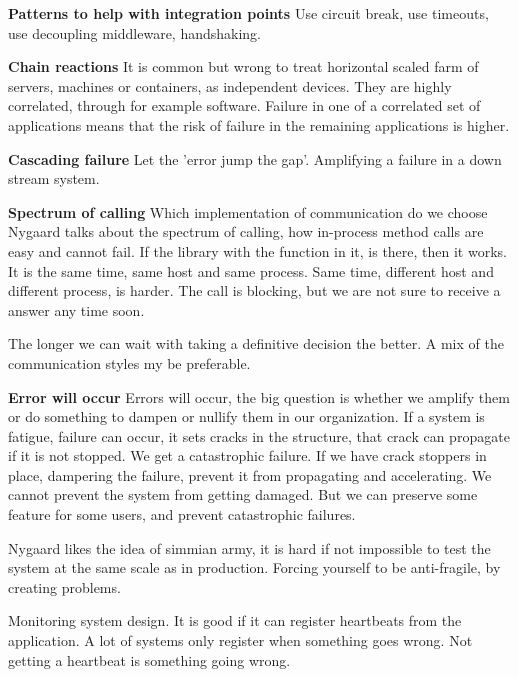 {\textbf{Patterns to help with integration points}
Use circuit break, use timeouts, use decoupling middleware, handshaking.

\textbf{Chain reactions}
It is common but wrong to treat horizontal scaled farm of servers, machines or containers, as independent devices. They are highly correlated, through for example software.
Failure in one of a correlated set of applications means that the risk of failure in the remaining applications is higher.

\textbf{Cascading failure}
Let the 'error jump the gap'. Amplifying a failure in a down stream system.


\textbf{Spectrum of calling}
Which implementation of communication do we choose 
Nygaard talks about the spectrum of calling, how in-process method calls are easy and cannot fail. If the library with the function in it, is there, then it works. It is the same time, same host and same process.
Same time, different host and different process, is harder. The call is blocking, but we are not sure to receive a answer any time soon.

The longer we can wait with taking a definitive decision the better. A mix of the communication styles my be preferable.


\textbf{Error will occur}
Errors will occur, the big question is whether we amplify them or do something to dampen or nullify them in our organization. 
If a system is fatigue, failure can occur, it sets cracks in the structure, that crack can propagate if it is not stopped. We get a catastrophic failure.
If we have crack stoppers in place, dampering the failure, prevent it from propagating and accelerating. 
We cannot prevent the system from getting damaged. But we can preserve some feature for some users, and prevent catastrophic failures.


Nygaard likes the idea of simmian army, it is hard if not impossible to test the system at the same scale as in production. Forcing yourself to be anti-fragile, by creating problems.

Monitoring system design. It is good if it can register heartbeats from the application. A lot of systems only register when something goes wrong. Not getting a heartbeat is something going wrong.
}




